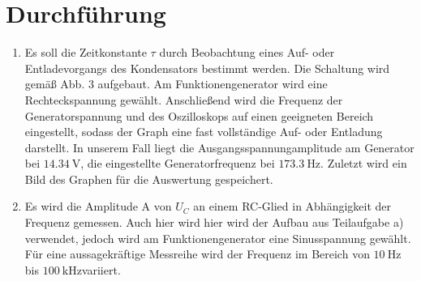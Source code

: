 \section{Durchführung}
\label{sec:Durchführung}


\renewcommand{\labelenumi}{\alph{enumi})}
\begin{enumerate}
  \item Es soll die Zeitkonstante $\tau$ durch Beobachtung eines Auf- oder Entladevorgangs
  des Kondensators bestimmt werden. Die Schaltung wird gemäß Abb. 3 aufgebaut. Am Funktionengenerator wird eine Rechteckspannung gewählt.
  Anschließend wird die Frequenz der Generatorspannung und des Oszilloskops auf einen
  geeigneten Bereich eingestellt, sodass der Graph eine fast vollständige Auf- oder Entladung darstellt. In unserem Fall
  liegt die Ausgangsspannungamplitude am Generator bei $\SI{14.34}{\volt}$,
   die eingestellte Generatorfrequenz bei $\SI{173.3}{\hertz}$. Zuletzt wird ein Bild des Graphen für die
  Auswertung gespeichert.%

  \item Es wird die Amplitude A von $U_C$ an einem RC-Glied in Abhängigkeit der Frequenz gemessen. Auch hier wird
  hier wird der Aufbau aus Teilaufgabe a) verwendet, jedoch wird am Funktionengenerator eine Sinusspannung gewählt.
   Für eine aussagekräftige Messreihe wird der Frequenz im Bereich von
    $\SI{10}{\hertz}$ bis $\SI{100}{\kilo\hertz} $variiert.%



\end{enumerate}
